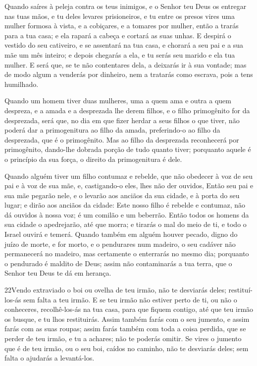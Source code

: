 Quando saíres à peleja contra os teus inimigos, e o Senhor teu
Deus os entregar nas tuas mãos, e tu deles levares prisioneiros,
e tu entre os presos vires uma mulher formosa à vista, e a
cobiçares, e a tomares por mulher, então a trarás para a tua
casa; e ela rapará a cabeça e cortará as suas unhas. E
despirá o vestido do seu cativeiro, e se assentará na tua casa, e
chorará a seu pai e a sua mãe um mês inteiro; e depois chegarás a
ela, e tu serás seu marido e ela tua mulher. E será que, se
te não contentares dela, a deixarás ir à sua vontade; mas de modo
algum a venderás por dinheiro, nem a tratarás como escrava, pois a
tens humilhado.

Quando um homem tiver duas mulheres, uma a quem ama e outra a
quem despreza, e a amada e a desprezada lhe derem filhos, e o filho
primogênito for da desprezada, será que, no dia em que fizer
herdar a seus filhos o que tiver, não poderá dar a primogenitura ao
filho da amada, preferindo-o ao filho da desprezada, que é o
primogênito. Mas ao filho da desprezada reconhecerá por
primogênito, dando-lhe dobrada porção de tudo quanto tiver;
porquanto aquele é o princípio da sua força, o direito da
primogenitura é dele.

Quando alguém tiver um filho contumaz e rebelde, que não obedecer
à voz de seu pai e à voz de sua mãe, e, castigando-o eles, lhes não
der ouvidos, Então seu pai e sua mãe pegarão nele, e o
levarão aos anciãos da sua cidade, e à porta do seu lugar; e
dirão aos anciãos da cidade: Este nosso filho é rebelde e contumaz,
não dá ouvidos à nossa voz; é um comilão e um beberrão. Então
todos os homens da sua cidade o apedrejarão, até que morra; e
tirarás o mal do meio de ti, e todo o Israel ouvirá e temerá.
Quando também em alguém houver pecado, digno do juízo de
morte, e for morto, e o pendurares num madeiro, o seu cadáver
não permanecerá no madeiro, mas certamente o enterrarás no mesmo
dia; porquanto o pendurado é maldito de Deus; assim não contaminarás
a tua terra, que o Senhor teu Deus te dá em herança.

\medskip

\lettrine{22} Vendo extraviado o boi ou ovelha de teu irmão,
não te desviarás deles; restituí-los-ás sem falta a teu irmão. E
se teu irmão não estiver perto de ti, ou não o conheceres,
recolhê-los-ás na tua casa, para que fiquem contigo, até que teu
irmão os busque, e tu lhos restituirás. Assim também farás com o
seu jumento, e assim farás com as suas roupas; assim farás também
com toda a coisa perdida, que se perder de teu irmão, e tu a
achares; não te poderás omitir. Se vires o jumento que é de teu
irmão, ou o seu boi, caídos no caminho, não te desviarás deles; sem
falta o ajudarás a levantá-los.

